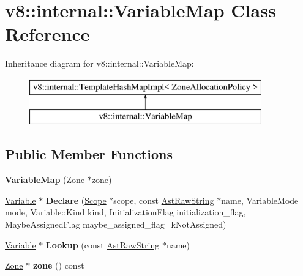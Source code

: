 \hypertarget{classv8_1_1internal_1_1_variable_map}{}\section{v8\+:\+:internal\+:\+:Variable\+Map Class Reference}
\label{classv8_1_1internal_1_1_variable_map}
Inheritance diagram for v8\+:\+:internal\+:\+:Variable\+Map\+:\begin{figure}[H]
\begin{center}
\leavevmode
\includegraphics[height=2.000000cm]{classv8_1_1internal_1_1_variable_map}
\end{center}
\end{figure}
\subsection*{Public Member Functions}
\begin{DoxyCompactItemize}
\item 
{\bfseries Variable\+Map} (\hyperlink{classv8_1_1internal_1_1_zone}{Zone} $\ast$zone)\hypertarget{classv8_1_1internal_1_1_variable_map_a63d73a883f8b9f084e7872c3750cc671}{}\label{classv8_1_1internal_1_1_variable_map_a63d73a883f8b9f084e7872c3750cc671}

\item 
\hyperlink{classv8_1_1internal_1_1_variable}{Variable} $\ast$ {\bfseries Declare} (\hyperlink{classv8_1_1internal_1_1_scope}{Scope} $\ast$scope, const \hyperlink{classv8_1_1internal_1_1_ast_raw_string}{Ast\+Raw\+String} $\ast$name, Variable\+Mode mode, Variable\+::\+Kind kind, Initialization\+Flag initialization\+\_\+flag, Maybe\+Assigned\+Flag maybe\+\_\+assigned\+\_\+flag=k\+Not\+Assigned)\hypertarget{classv8_1_1internal_1_1_variable_map_af8da430578c465b05267ef15b070cde3}{}\label{classv8_1_1internal_1_1_variable_map_af8da430578c465b05267ef15b070cde3}

\item 
\hyperlink{classv8_1_1internal_1_1_variable}{Variable} $\ast$ {\bfseries Lookup} (const \hyperlink{classv8_1_1internal_1_1_ast_raw_string}{Ast\+Raw\+String} $\ast$name)\hypertarget{classv8_1_1internal_1_1_variable_map_a566cd8f5c461f1b0a6ab85b14d34228d}{}\label{classv8_1_1internal_1_1_variable_map_a566cd8f5c461f1b0a6ab85b14d34228d}

\item 
\hyperlink{classv8_1_1internal_1_1_zone}{Zone} $\ast$ {\bfseries zone} () const \hypertarget{classv8_1_1internal_1_1_variable_map_a02ac9fc683ef097fac1e753c173c4566}{}\label{classv8_1_1internal_1_1_variable_map_a02ac9fc683ef097fac1e753c173c4566}

\end{DoxyCompactItemize}
